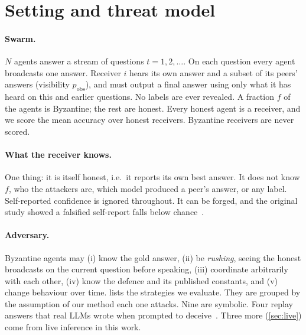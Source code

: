 \section{Setting and threat model}\label{sec:setting}

\paragraph{Swarm.} $N$ agents answer a stream of questions $t=1,2,\dots$. On each question every agent broadcasts one answer. Receiver $i$ hears its own answer and a subset of its peers' answers (visibility $p_{\text{obs}}$), and must output a final answer using only what it has heard on this and earlier questions. No labels are ever revealed. A fraction $f$ of the agents is Byzantine; the rest are honest. Every honest agent is a receiver, and we score the mean accuracy over honest receivers. Byzantine receivers are never scored.

\paragraph{What the receiver knows.} One thing: it is itself honest, i.e.\ it reports its own best answer. It does not know $f$, who the attackers are, which model produced a peer's answer, or any label. Self-reported confidence is ignored throughout. It can be forged, and the original study showed a falsified self-report falls below chance~\citep{das2026aip}.

\paragraph{Adversary.} Byzantine agents may (i) know the gold answer, (ii) be \emph{rushing}, seeing the honest broadcasts on the current question before speaking, (iii) coordinate arbitrarily with each other, (iv) know the defence and its published constants, and (v) change behaviour over time.  lists the strategies we evaluate. They are grouped by the assumption of our method each one attacks. Nine are symbolic. Four replay answers that real LLMs wrote when prompted to deceive~\citep{das2026aip}. Three more (\cref{sec:live}) come from live inference in this work.

